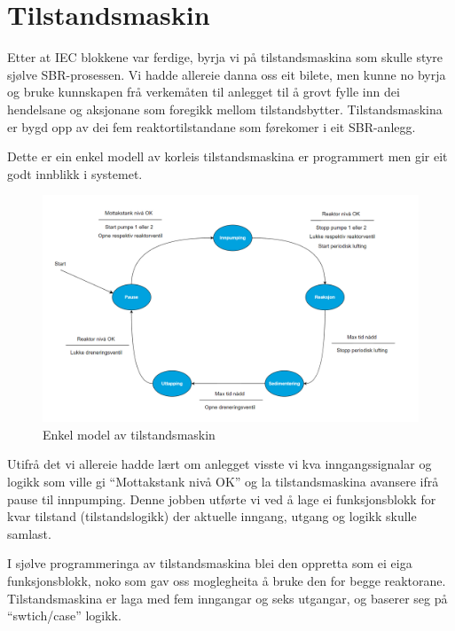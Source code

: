\section{Tilstandsmaskin}
\thispagestyle{fancy}

Etter at \gls{IEC} blokkene var ferdige, byrja vi på tilstandsmaskina som skulle styre sjølve \gls{SBR}-prosessen. 
Vi hadde allereie danna oss eit bilete, men kunne no byrja og bruke kunnskapen frå verkemåten til anlegget
til å grovt fylle inn dei hendelsane og aksjonane som foregikk mellom tilstandsbytter. 
Tilstandsmaskina er bygd opp av dei fem reaktortilstandane som førekomer i eit \gls{SBR}-anlegg.

Dette er ein enkel modell av korleis tilstandsmaskina er programmert men gir eit godt innblikk i systemet.

\begin{figure}[htbp]
    \centering
    \includegraphics[width=1\textwidth]{Figurar/Simpel tilstandsmaskin.png}
    \caption{Enkel model av tilstandsmaskin}\label{fig:SimpelTilstandsmaskin}
\end{figure}

Utifrå det vi allereie hadde lært om anlegget visste vi kva inngangssignalar og logikk som ville gi
``Mottakstank nivå OK'' og la tilstandsmaskina avansere ifrå pause til innpumping. Denne jobben utførte vi ved å lage ei
funksjonsblokk for kvar tilstand (tilstandslogikk) der aktuelle inngang, utgang og logikk skulle samlast.

\newpage

I sjølve programmeringa av tilstandsmaskina blei den oppretta som ei eiga funksjonsblokk, noko som gav oss moglegheita å bruke den for begge reaktorane.
Tilstandsmaskina er laga med fem inngangar og seks utgangar, og baserer seg på ``swtich/case'' logikk.


